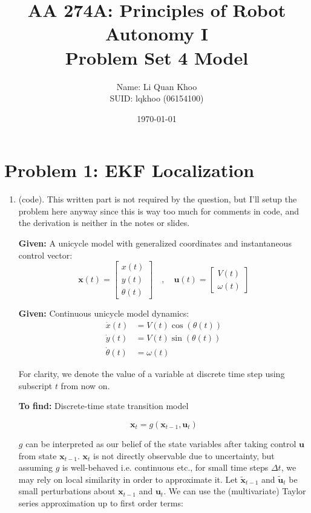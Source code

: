\documentclass{article}
\title{AA 274A: Principles of Robot Autonomy I \\ Problem Set 4 Model}
\author{Name: Li Quan Khoo     \\ SUID: lqkhoo (06154100)}
\date{\today}
\begin{document}
\maketitle
\pagestyle{fancy} 

\section*{Problem 1: EKF Localization}
\begin{enumerate}[label=(\roman*)]
\item %
(code). This written part is not required by the question, but I'll setup the problem here anyway since this is way too much for comments in code, and the derivation is neither in the notes or slides.

\textbf{Given:} A unicycle model with generalized coordinates and instantaneous control vector:
\begin{equation}
\mathbf{x}(t)=
\begin{bmatrix}
x(t) \\ y(t) \\ \theta(t)
\end{bmatrix}
\quad , \quad
\mathbf{u}(t) =
\begin{bmatrix}
V(t) \\ \omega(t)
\end{bmatrix}
\end{equation}

\textbf{Given:} Continuous unicycle model dynamics:
\begin{equation}
\begin{aligned}
\dot{x}(t) &= V(t) \cos(\theta(t)) \\
\dot{y}(t) &= V(t) \sin(\theta(t)) \\
\dot{\theta}(t) &= \omega(t)
\end{aligned}
\end{equation}

For clarity, we denote the value of a variable at discrete time step using subscript $t$ from now on.

\textbf{To find:} Discrete-time state transition model

\begin{equation}
\mathbf{x}_t = g(\mathbf{x}_{t-1}, \mathbf{u}_t)
\end{equation}

$g$ can be interpreted as our belief of the state variables after taking control $\mathbf{u}$ from state $\mathbf{x}_{t-1}$. $\mathbf{x}_t$ is not directly observable due to uncertainty, but assuming $g$ is well-behaved i.e. continuous etc., for small time steps $\Delta t$, we may rely on local similarity in order to approximate it. Let $\tilde{\mathbf{x}}_{t-1}$ and $\tilde{\mathbf{u}}_t$ be small perturbations about $\mathbf{x}_{t-1}$ and $\mathbf{u}_t$. We can use the (multivariate) Taylor series approximation up to first order terms:


\end{enumerate}
\end{document}

